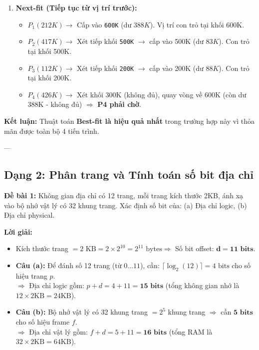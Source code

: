 \documentclass[11pt,a4paper]{article}
\begin{document}
\begin{enumerate}
    \item \textbf{Next-fit (Tiếp tục từ vị trí trước):}
    \begin{itemize}[noitemsep]
        \item $P_1 (212K) \rightarrow$ Cấp vào \texttt{600K} (dư $388K$). Vị trí con trỏ tại khối 600K.
        \item $P_2 (417K) \rightarrow$ Xét tiếp khối \texttt{500K} $\rightarrow$ cấp vào 500K (dư $83K$). Con trỏ tại khối 500K.
        \item $P_3 (112K) \rightarrow$ Xét tiếp khối \texttt{200K} $\rightarrow$ cấp vào 200K (dư $88K$). Con trỏ tại khối 200K.
        \item $P_4 (426K) \rightarrow$ Xét khối 300K (không đủ), quay vòng về 600K (còn dư 388K - không đủ) $\Rightarrow$ \textbf{P4 phải chờ}.
    \end{itemize}
\end{enumerate}
\textbf{Kết luận:} Thuật toán \textbf{Best-fit là hiệu quả nhất} trong trường hợp này vì thỏa mãn được toàn bộ 4 tiến trình.

---

\subsection{Dạng 2: Phân trang và Tính toán số bit địa chỉ}

\begin{examplebox}
\textbf{Đề bài 1:} Không gian địa chỉ có 12 trang, mỗi trang kích thước 2KB, ánh xạ vào bộ nhớ vật lý có 32 khung trang. Xác định số bit của: (a) Địa chỉ logic, (b) Địa chỉ physical.
\end{examplebox}

\textbf{Lời giải:}
\begin{itemize}
    \item Kích thước trang $= 2\text{ KB} = 2 \times 2^{10} = 2^{11}\text{ bytes} \Rightarrow$ Số bit offset: $\mathbf{d = 11\text{ bits}}$.
    \item \textbf{Câu (a):} Để đánh số 12 trang (từ $0 \dots 11$), cần: $\lceil \log_2(12) \rceil = 4\text{ bits}$ cho số hiệu trang $p$.\\
    $\Rightarrow$ Địa chỉ logic gồm: $p + d = 4 + 11 = \mathbf{15\text{ bits}}$ (tổng không gian nhớ là $12 \times 2\text{KB} = 24\text{KB}$).
    \item \textbf{Câu (b):} Bộ nhớ vật lý có 32 khung trang $= 2^5$ khung trang $\Rightarrow$ cần $\mathbf{5\text{ bits}}$ cho số hiệu frame $f$.\\
    $\Rightarrow$ Địa chỉ vật lý gồm: $f + d = 5 + 11 = \mathbf{16\text{ bits}}$ (tổng RAM là $32 \times 2\text{KB} = 64\text{KB}$).
\end{itemize}
\end{document}
